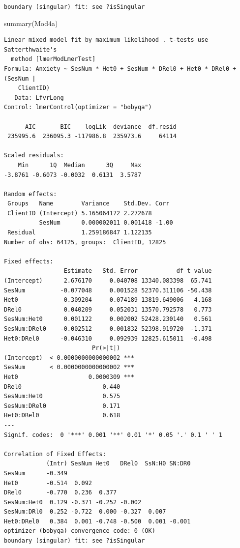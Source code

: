 \documentclass[
  english,
]{book}
\newenvironment{Shaded}{\begin{snugshade}}{\end{snugshade}}
\newcommand{\FunctionTok}[1]{\textcolor[rgb]{0.00,0.00,0.00}{#1}}
\newcommand{\NormalTok}[1]{#1}
\begin{document}
\begin{verbatim}
boundary (singular) fit: see ?isSingular
\end{verbatim}

\begin{Shaded}
\begin{Highlighting}[]
\FunctionTok{summary}\NormalTok{(Mod4a)}
\end{Highlighting}
\end{Shaded}

\begin{verbatim}
Linear mixed model fit by maximum likelihood . t-tests use Satterthwaite's
  method [lmerModLmerTest]
Formula: Anxiety ~ SesNum * Het0 + SesNum * DRel0 + Het0 * DRel0 + (SesNum |  
    ClientID)
   Data: LfvrLong
Control: lmerControl(optimizer = "bobyqa")

      AIC       BIC    logLik  deviance  df.resid 
 235995.6  236095.3 -117986.8  235973.6     64114 

Scaled residuals: 
    Min      1Q  Median      3Q     Max 
-3.8761 -0.6073 -0.0032  0.6131  3.5787 

Random effects:
 Groups   Name        Variance    Std.Dev. Corr 
 ClientID (Intercept) 5.165064172 2.272678      
          SesNum      0.000002011 0.001418 -1.00
 Residual             1.259186847 1.122135      
Number of obs: 64125, groups:  ClientID, 12825

Fixed effects:
                 Estimate   Std. Error           df t value
(Intercept)      2.676170     0.040708 13340.083398  65.741
SesNum          -0.077048     0.001528 52370.311106 -50.438
Het0             0.309204     0.074189 13819.649006   4.168
DRel0            0.040209     0.052031 13570.792578   0.773
SesNum:Het0      0.001122     0.002002 52428.230140   0.561
SesNum:DRel0    -0.002512     0.001832 52398.919720  -1.371
Het0:DRel0      -0.046310     0.092939 12825.615011  -0.498
                         Pr(>|t|)    
(Intercept)  < 0.0000000000000002 ***
SesNum       < 0.0000000000000002 ***
Het0                    0.0000309 ***
DRel0                       0.440    
SesNum:Het0                 0.575    
SesNum:DRel0                0.171    
Het0:DRel0                  0.618    
---
Signif. codes:  0 '***' 0.001 '**' 0.01 '*' 0.05 '.' 0.1 ' ' 1

Correlation of Fixed Effects:
            (Intr) SesNum Het0   DRel0  SsN:H0 SN:DR0
SesNum      -0.349                                   
Het0        -0.514  0.092                            
DRel0       -0.770  0.236  0.377                     
SesNum:Het0  0.129 -0.371 -0.252 -0.002              
SesNum:DRl0  0.252 -0.722  0.000 -0.327  0.007       
Het0:DRel0   0.384  0.001 -0.748 -0.500  0.001 -0.001
optimizer (bobyqa) convergence code: 0 (OK)
boundary (singular) fit: see ?isSingular
\end{verbatim}
\end{document}
